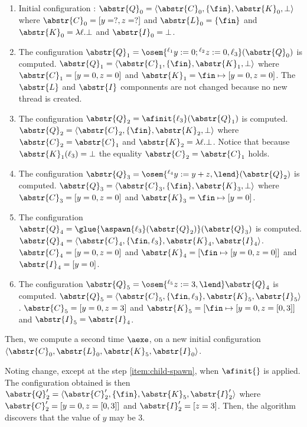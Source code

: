 \documentclass[12pt]{article}
\newcommand{\li}[1]{ {}^{\ell_{#1}}  }
\newcommand{\fleche}{\mapsto}
\newcommand{\func}[2]{\lambda #1. #2 } \newcommand{\fx}[3]{#1[#2 \fleche #3]} \newcommand{\nf}[3]{#1\smallsetminus[#2 \fleche #3]}  \newcommand{\ndf}[2]{#1(#2)\uparrow}
\begin{document}
\begin{enumerate}
 \item Initial configuration : \(\abstr{Q}_0=\langle\abstr{C}_0,\{\fin\},\abstr{K}_0,\bot\rangle \) where \(\abstr{C}_0=[y=?, z=?]\) and \(\abstr{L}_0=\{\fin\}\) and \(\abstr{K}_0=\func{\ell}{\bot}\) and \(\abstr{I}_0=\bot\).
 \item The configuration \(\abstr{Q}_1=\osem{\li1 y:=0;\li2 z:=0,\ell_3}(\abstr{Q}_0)\) is computed. \(\abstr{Q}_1=\langle \abstr{C}_1,\{\fin\},\abstr{K}_1,\bot \rangle \) where \(\abstr{C}_1=[y=0, z=0]\) and \(\abstr{K}_1=\fin\mapsto [y=0,z=0]\).
 The \(\abstr{L}\) and \(\abstr{I}\) componnents are not changed because no new thread is created.
 \item\label{item:child-spawn}  The configuration \(\abstr{Q}_2=\afinit{\ell_3}(\abstr{Q}_1)\) is computed. \(\abstr{Q}_2=\langle \abstr{C}_2, \{\fin\},\abstr{K}_2,\bot \rangle \) where \(\abstr{C}_2=\abstr{C}_1\) and \(\abstr{K}_2=\func{\ell}{\bot}\). Notice that because \(\abstr{K}_1(\ell_3)=\bot\) the equality \(\abstr{C}_2=\abstr{C}_1\) holds.
 \item  The configuration  \(\abstr{Q}_3=\osem{\li4y:=y+z,\lend}(\abstr{Q}_2)\) is computed.   \(\abstr{Q}_3=\langle\abstr{C}_3,\{\fin\},\abstr{K}_3,\bot \rangle\) where \(\abstr{C}_3=[y=0, z=0]\) and \(\abstr{K}_3=\fin\mapsto [y=0] \).
 \item  The configuration  \(\abstr{Q}_4=\glue{\aspawn{\ell_3}(\abstr{Q}_2)}(\abstr{Q}_3) \) is computed.
 \(\abstr{Q}_4=\langle \abstr{C}_4, \{\fin,\ell_3\},\abstr{K}_4,\abstr{I}_4 \rangle\).
  \(\abstr{C}_4=[y=0, z=0]\) and \(\abstr{K}_4=[\fin\mapsto [y=0,z=0]]\) and \(\abstr{I}_4=[y=0]\).
  \item  The configuration  \(\abstr{Q}_5=\osem{\li5 z:=3,\lend} \abstr{Q}_4\) is computed.
   \(\abstr{Q}_5=\langle \abstr{C}_5, \{\fin,\ell_3\},\abstr{K}_5,\abstr{I}_5 \rangle\).
  \(\abstr{C}_5=[y=0, z=3]\) and \(\abstr{K}_5=[\fin\mapsto [y=0,z=[0,3]]\) and \(\abstr{I}_5=\abstr{I}_4\).
\end{enumerate}

Then, we compute a second time \(\aexe\), on a new initial configuration \(\langle \abstr{C}_0,\abstr{L}_0,\abstr{K}_5,\abstr{I}_0 \rangle \).

\myexample
 Noting change, except at the step \ref{item:child-spawn}, when \(\afinit{}\) is applied.
 The configuration obtained is then \(\abstr{Q}'_2=\langle \abstr{C}'_2, \{\fin\},\abstr{K}_5, \abstr{I}'_2 \rangle \) where \(\abstr{C}'_2= [y=0,z=[0,3]] \) and \(\abstr{I}'_2 = [z=3] \).
 Then, the algorithm discovers that the value of \(y\) may be 3.
 
\end{document}
